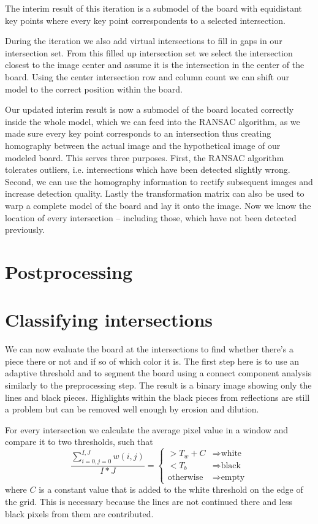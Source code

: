 	The interim result of this iteration is a submodel of the board with equidistant key points where every key point correspondents to a selected intersection.

	During the iteration we also add virtual intersections to fill in gaps in our intersection set. From this filled up intersection set we select the intersection closest to the image center and assume it is the intersection in the center of the board. Using the center intersection row and column count we can shift our model to the correct position within the board.

	Our updated interim result is now a submodel of the board located correctly inside the whole model, which we can feed into the RANSAC algorithm, as we made sure every key point corresponds to an intersection thus creating homography between the actual image and the hypothetical image of our modeled board. This serves three purposes. First, the RANSAC algorithm tolerates outliers, i.e. intersections which have been detected slightly wrong. Second, we can use the homography information to rectify subsequent images and increase detection quality. Lastly the transformation matrix can also be used to warp a complete model of the board and lay it onto the image. Now we know the location of every intersection -- including those, which have not been detected previously.

	\section{Postprocessing}
	\label{detector-postprocessing}

	\section{Classifying intersections}
	\label{detector-classifying}
	We can now evaluate the board at the intersections to find whether there's a piece there or not and if so of which color it is. The first step here is to use an adaptive threshold and to segment the board using a connect component analysis similarly to the preprocessing step. The result is a binary image showing only the lines and black pieces. Highlights within the black pieces from reflections are still a problem but can be removed well enough by erosion and dilution.

	For every intersection we calculate the average pixel value in a window and compare it to two thresholds, such that \begin{equation}
		\frac{\sum^{I,J}_{i=0,j=0}w(i,j)}{I*J} =
		\begin{cases}
		> T_{w} + C & \Rightarrow  \text{white}\\
		< T_{b} & \Rightarrow \text{black}\\
		\text{otherwise} & \Rightarrow \text{empty}
		\end{cases}
	\end{equation}
	where $C$ is a constant value that is added to the white threshold on the edge of the grid. This is necessary because the lines are not continued there and less black pixels from them are contributed.

